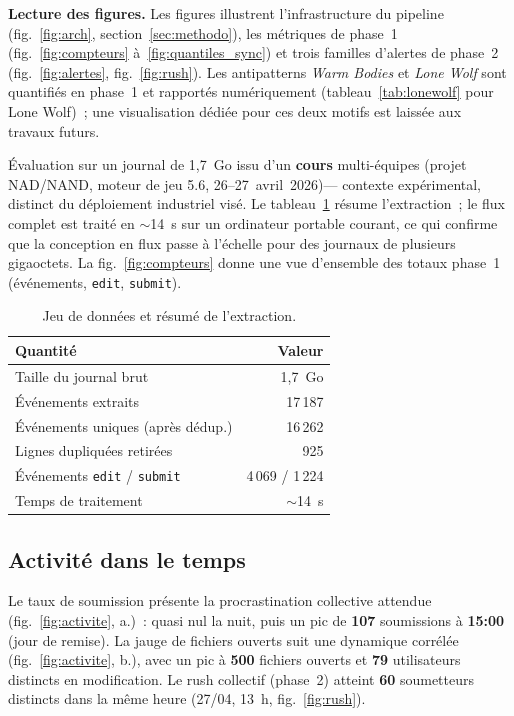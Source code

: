 \documentclass[conference]{IEEEtran}
\begin{document}
\textbf{Lecture des figures.}
Les figures illustrent l'infrastructure du pipeline
(fig.~\ref{fig:arch}, section~\ref{sec:methodo}), les métriques de
phase~1 (fig.~\ref{fig:compteurs} à~\ref{fig:quantiles_sync}) et trois
familles d'alertes de phase~2 (fig.~\ref{fig:alertes},
fig.~\ref{fig:rush}). Les antipatterns \emph{Warm Bodies} et
\emph{Lone Wolf} sont quantifiés en phase~1 et rapportés
numériquement (tableau~\ref{tab:lonewolf} pour Lone Wolf)~; une
visualisation dédiée pour ces deux motifs est laissée aux travaux
futurs.

Évaluation sur un journal de 1,7~Go issu d'un \textbf{cours}
multi-équipes (projet NAD/NAND, moteur de jeu 5.6, 26--27~avril~2026)---
contexte expérimental, distinct du déploiement industriel visé.
Le tableau~\ref{tab:data} résume l'extraction~; le flux complet est
traité en ${\sim}$14~s sur un ordinateur portable courant, ce qui
confirme que la conception en flux passe à l'échelle pour des journaux
de plusieurs gigaoctets. La fig.~\ref{fig:compteurs} donne une vue
d'ensemble des totaux phase~1 (événements, \texttt{edit},
\texttt{submit}).

\begin{table}[!t]
  \caption{Jeu de données et résumé de l'extraction.}
  \label{tab:data}
  \centering
  \scriptsize
  \begin{tabularx}{\linewidth}{@{}Xr@{}}
    \toprule
    \textbf{Quantité} & \textbf{Valeur} \\
    \midrule
    Taille du journal brut & 1,7~Go \\
    Événements extraits & 17\,187 \\
    Événements uniques (après dédup.) & 16\,262 \\
    Lignes dupliquées retirées & 925 \\
    Événements \texttt{edit} / \texttt{submit} & 4\,069 / 1\,224 \\
    Temps de traitement & ${\sim}$14~s \\
    \bottomrule
  \end{tabularx}
\end{table}

\figUnCompteurs

\subsection{Activité dans le temps}
Le taux de soumission présente la procrastination collective attendue
(fig.~\ref{fig:activite}, a.)~: quasi nul la nuit, puis un pic de
\textbf{107} soumissions à \textbf{15:00} (jour de remise). La jauge de
fichiers ouverts suit une dynamique corrélée (fig.~\ref{fig:activite},
b.), avec un pic à \textbf{500} fichiers ouverts et \textbf{79}
utilisateurs distincts en modification. Le rush collectif (phase~2)
atteint \textbf{60} soumetteurs distincts dans la même heure (27/04,
13~h, fig.~\ref{fig:rush}).
\end{document}
